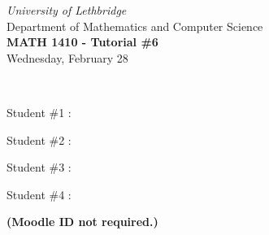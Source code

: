 \documentclass[12pt]{article}
\newcommand{\skipline}{\vspace{12pt}}
\begin{document}
\author{Instructor: Sean Fitzpatrick}
\thispagestyle{empty}
\begin{center}
\emph{University of Lethbridge}\\
Department of Mathematics and Computer Science\\
{\bf MATH 1410 - Tutorial \#6}\\
Wednesday, February 28
\end{center}
\skipline \ \noindent \skipline

Student \#1 :\underline{\hspace{348pt}}\\

\bigskip

\bigskip

Student \#2 :\underline{\hspace{348pt}}\\

\bigskip

\bigskip

Student \#3 :\underline{\hspace{348pt}}\\

\bigskip

\bigskip

Student \#4 :\underline{\hspace{348pt}}\\





\bigskip

\textbf{(Moodle ID not required.)}

\bigskip

\bigskip
\end{document}
